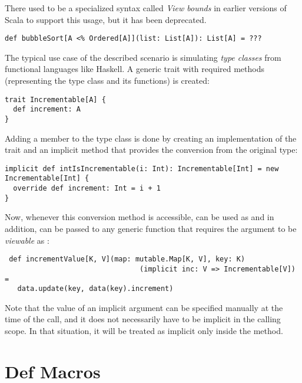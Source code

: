 There used to be a specialized syntax called \textit{View bounds} in earlier versions of Scala to support this usage, but it has been deprecated.

\lstset{style=Scala}
\begin{lstlisting}
def bubbleSort[A <% Ordered[A]](list: List[A]): List[A] = ???
\end{lstlisting}

The typical use case of the described scenario is simulating \textit{type classes} from functional languages like Haskell. A generic trait with required methods (representing the type class and its functions) is created:

\lstset{style=Scala}
\begin{lstlisting}
trait Incrementable[A] {
  def increment: A
}
\end{lstlisting}

 Adding a member to the type class is done by creating an implementation of the trait and an implicit method that provides the conversion from the original type:
 
 \lstset{style=Scala}
 \begin{lstlisting}
implicit def intIsIncrementable(i: Int): Incrementable[Int] = new Incrementable[Int] {
  override def increment: Int = i + 1
}
 \end{lstlisting}
 
 Now, whenever this conversion method is accessible,  can be used as  and in addition, can be passed to any generic function that requires the argument to be \textit{viewable} as :
 
  \lstset{style=Scala}
 \begin{lstlisting}
 def incrementValue[K, V](map: mutable.Map[K, V], key: K)
                                (implicit inc: V => Incrementable[V]) =
   data.update(key, data(key).increment)
  \end{lstlisting}
  
Note that the value of an implicit argument can be specified manually at the time of the call, and it does not necessarily have to be implicit in the calling scope. In that situation, it will be treated as implicit only inside the method.

\section{Def Macros}
\label{sec:defmacros}

